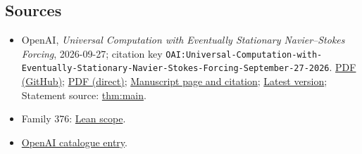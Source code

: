 \documentclass[11pt]{article}
\begin{document}
\subsection{Sources}
\begin{itemize}
\item OpenAI, \emph{Universal Computation with Eventually Stationary Navier–Stokes Forcing}, 2026-09-27; citation key \texttt{OAI:Universal-Computation-with-Eventually-Stationary-Navier-Stokes-Forcing-September-27-2026}. \href{https://github.com/openai/math/blob/adc7f1241b42e322a6451854ab7e4b4c146bf78a/preprints/Universal-Computation-with-Eventually-Stationary-Navier-Stokes-Forcing-September-27-2026/manuscript.pdf}{PDF (GitHub)}; \href{https://github.com/openai/math/raw/adc7f1241b42e322a6451854ab7e4b4c146bf78a/preprints/Universal-Computation-with-Eventually-Stationary-Navier-Stokes-Forcing-September-27-2026/manuscript.pdf}{PDF (direct)}; \href{https://github.com/openai/math/blob/adc7f1241b42e322a6451854ab7e4b4c146bf78a/preprints/Universal-Computation-with-Eventually-Stationary-Navier-Stokes-Forcing-September-27-2026/README.md}{Manuscript page and citation}; \href{https://github.com/openai/math/blob/main/preprints/Universal-Computation-with-Eventually-Stationary-Navier-Stokes-Forcing-September-27-2026/manuscript.pdf}{Latest version}; Statement source: \href{https://github.com/openai/math/blob/adc7f1241b42e322a6451854ab7e4b4c146bf78a/preprints/Universal-Computation-with-Eventually-Stationary-Navier-Stokes-Forcing-September-27-2026/build/main.tex\#L146}{thm:main}.
\item Family 376: \href{https://github.com/openai/math/blob/adc7f1241b42e322a6451854ab7e4b4c146bf78a/lean/docs/376.md}{Lean scope}.
\item \href{https://github.com/openai/math/blob/adc7f1241b42e322a6451854ab7e4b4c146bf78a/CONTENTS.md}{OpenAI catalogue entry}.
\end{itemize}
\end{document}
